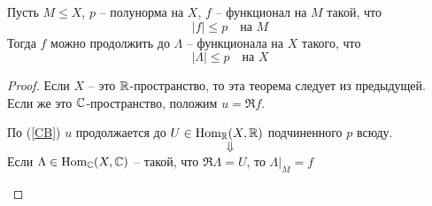 \documentclass[12pt, a4paper, oneside]{book}
\begin{document}
\begin{theorem}
    Пусть $M \leqslant X$, $p$ -- полунорма на $X$, $f$ -- функционал на $M$ такой, что
    $$|f| \leqslant p \quad \text{на }M$$
    Тогда $f$ можно продолжить до $\Lambda$ -- функционала на $X$ такого, что
    $$|\Lambda|\leqslant p \quad \text{на }X$$
\end{theorem}
\begin{proof}
Если $X$ -- это $\mathbb{R}$-пространство, то эта теорема следует из предыдущей. Если же это $\mathbb{C}$-пространство, положим $u = \Re f$.
\newpage
\begin{center}

    По (\ref{CB}) $u$ продолжается до $U \in \operatorname{Hom}_{\mathbb{R}}(X, \mathbb{R})$  подчиненного $p$ всюду.
    $$\Downarrow$$
    Если $\Lambda \in \operatorname{Hom}_{\mathbb{C}}(X, \mathbb{C})$ -- такой, что $\Re \Lambda = U$, то $\Lambda|_M = f$
\end{center}

\end{proof}


    
    
\end{document}
